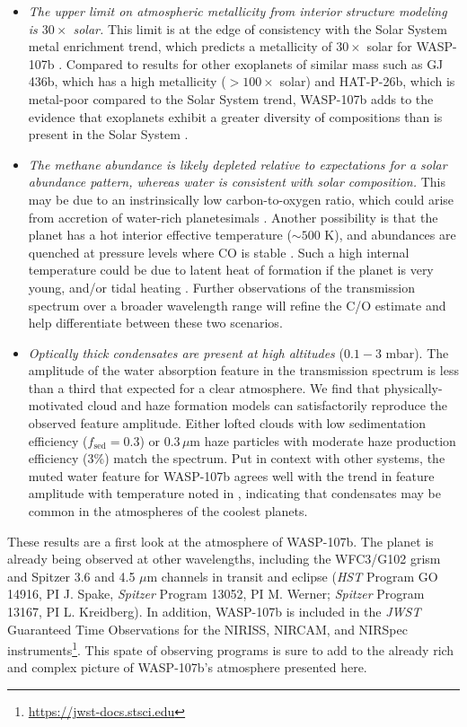 \documentclass[twocolumn, trackchanges]{aastex61}
\begin{document}
\begin{itemize}
\item{\emph{The upper limit on atmospheric metallicity from interior structure modeling is $30\times$ solar.} This limit is at the edge of consistency with the Solar System metal enrichment trend, which predicts a metallicity of $30\times$ solar for WASP-107b \citep{kreidberg14b}.  Compared to results for other exoplanets of similar mass such as GJ 436b, which has a high metallicity ($>100\times$ solar) and HAT-P-26b, which is metal-poor compared to the Solar System trend, WASP-107b adds to the evidence that exoplanets exhibit a greater diversity of compositions than is present in the Solar System \citep{morley17, wakeford17}.}
\item{\emph{The methane abundance is likely depleted relative to expectations for a solar abundance pattern, whereas water is consistent with solar composition.} This may be due to an instrinsically low carbon-to-oxygen ratio, which could arise from accretion of water-rich planetesimals \citep{mordasini16, espinoza17}.  Another possibility is that the planet has a hot interior effective temperature ($\sim500$ K), and abundances are quenched at pressure levels where CO is stable \citep[as observed in some directly imaged planets;][]{skemer14, zahnle14}. Such a high internal temperature could be due to latent heat of formation if the planet is very young, and/or tidal heating \citep{fortney08, morley17}. Further observations of the transmission spectrum over a broader wavelength range will refine the C/O estimate and help differentiate between these two scenarios.} 
\item{\emph{Optically thick condensates are present at high altitudes} ($0.1 - 3$ mbar). The amplitude of the water absorption feature in the transmission spectrum is less than a third that expected for a clear atmosphere.  We find that physically-motivated cloud and haze formation models can satisfactorily reproduce the observed feature amplitude. Either lofted clouds with low sedimentation efficiency ($f_\mathrm{sed} = 0.3$) or $0.3\,\mu$m haze particles with moderate haze production efficiency (3\%) match the spectrum. Put in context with other systems, the muted water feature for WASP-107b agrees well with the trend in feature amplitude with temperature noted in \cite{crossfield17}, indicating that condensates may be common in the atmospheres of the coolest planets.}
\end{itemize}

These results are a first look at the atmosphere of WASP-107b. The planet is already being observed at other wavelengths, including the WFC3/G102 grism and Spitzer 3.6 and 4.5 $\mu$m channels in transit and eclipse (\emph{HST} Program GO 14916, PI J. Spake, \emph{Spitzer} Program 13052, PI M. Werner; \emph{Spitzer} Program 13167, PI L. Kreidberg).  In addition, WASP-107b is included in the \emph{JWST} Guaranteed Time Observations for the NIRISS, NIRCAM, and NIRSpec instruments\footnote{\url{https://jwst-docs.stsci.edu}}.  This spate of observing programs is sure to add to the already rich and complex picture of WASP-107b's atmosphere presented here. 
\end{document}
